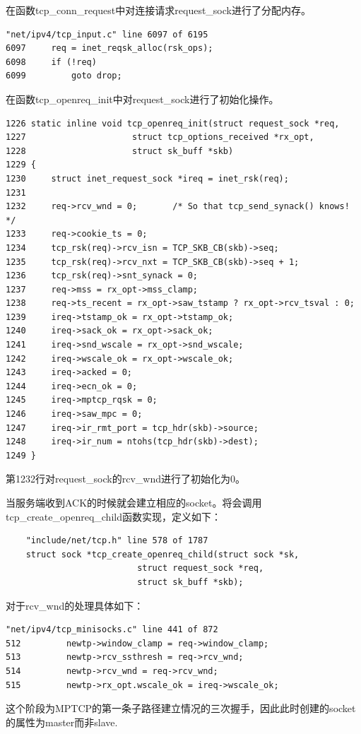 在函数tcp\_conn\_request中对连接请求request\_sock进行了分配内存。
\small\begin{verbatim}
"net/ipv4/tcp_input.c" line 6097 of 6195
6097     req = inet_reqsk_alloc(rsk_ops);
6098     if (!req)
6099         goto drop;
\end{verbatim}\normalsize
在函数tcp\_openreq\_init中对request\_sock进行了初始化操作。
\small\begin{verbatim}
1226 static inline void tcp_openreq_init(struct request_sock *req,
1227                     struct tcp_options_received *rx_opt,
1228                     struct sk_buff *skb)
1229 {
1230     struct inet_request_sock *ireq = inet_rsk(req);
1231
1232     req->rcv_wnd = 0;       /* So that tcp_send_synack() knows! */
1233     req->cookie_ts = 0;
1234     tcp_rsk(req)->rcv_isn = TCP_SKB_CB(skb)->seq;
1235     tcp_rsk(req)->rcv_nxt = TCP_SKB_CB(skb)->seq + 1;
1236     tcp_rsk(req)->snt_synack = 0;
1237     req->mss = rx_opt->mss_clamp;
1238     req->ts_recent = rx_opt->saw_tstamp ? rx_opt->rcv_tsval : 0;
1239     ireq->tstamp_ok = rx_opt->tstamp_ok;
1240     ireq->sack_ok = rx_opt->sack_ok;
1241     ireq->snd_wscale = rx_opt->snd_wscale;
1242     ireq->wscale_ok = rx_opt->wscale_ok;
1243     ireq->acked = 0;
1244     ireq->ecn_ok = 0;
1245     ireq->mptcp_rqsk = 0;
1246     ireq->saw_mpc = 0;
1247     ireq->ir_rmt_port = tcp_hdr(skb)->source;
1248     ireq->ir_num = ntohs(tcp_hdr(skb)->dest);
1249 }
\end{verbatim}\normalsize
第1232行对request\_sock的rcv\_wnd进行了初始化为0。

当服务端收到ACK的时候就会建立相应的socket。将会调用tcp\_create\_openreq\_child函数实现，定义如下：
\small\begin{verbatim}
    "include/net/tcp.h" line 578 of 1787
    struct sock *tcp_create_openreq_child(struct sock *sk,
                          struct request_sock *req,
                          struct sk_buff *skb);
\end{verbatim}\normalsize
对于rcv\_wnd的处理具体如下：
\small\begin{verbatim}
"net/ipv4/tcp_minisocks.c" line 441 of 872
512         newtp->window_clamp = req->window_clamp;
513         newtp->rcv_ssthresh = req->rcv_wnd;
514         newtp->rcv_wnd = req->rcv_wnd;
515         newtp->rx_opt.wscale_ok = ireq->wscale_ok;
\end{verbatim}\normalsize
这个阶段为MPTCP的第一条子路径建立情况的三次握手，因此此时创建的socket的属性为master而非slave.

